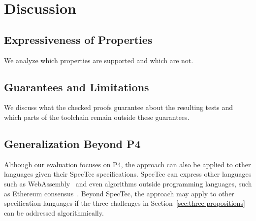 \section{Discussion}
\label{sec:discussion}

\subsection{Expressiveness of Properties}
\label{sec:property-expressiveness}

We analyze which properties are supported and which are not.

\subsection{Guarantees and Limitations}
\label{sec:agent-support}
\label{sec:limitations}

We discuss what the checked proofs guarantee about the resulting tests and which parts of the toolchain remain outside these guarantees.

\subsection{Generalization Beyond P4}
\label{sec:beyond}

Although our evaluation focuses on P4, the approach can also be applied to other languages given their SpecTec specifications.
SpecTec can express other languages such as WebAssembly~\cite{youn24spectec} and even algorithms outside programming languages, such as Ethereum consensus~\cite{jeong26spectrum}.
Beyond SpecTec, the approach may apply to other specification languages if the three challenges in Section~\ref{sec:three-propositions} can be addressed algorithmically.
